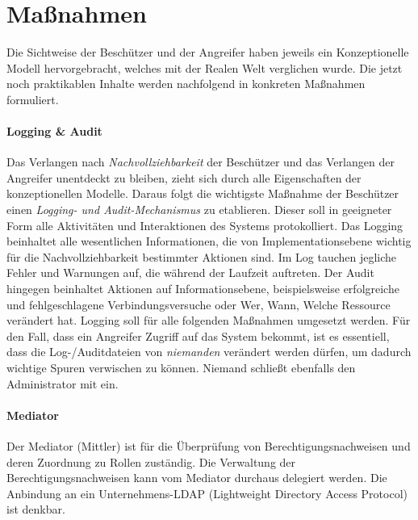 \documentclass[11pt,a4paper]{report}
\begin{document}
\section{Maßnahmen} \label{sec:analysis_measures}

Die Sichtweise der Beschützer und der Angreifer haben jeweils ein Konzeptionelle Modell hervorgebracht, welches mit der Realen Welt verglichen wurde. Die jetzt noch praktikablen Inhalte werden nachfolgend in konkreten Maßnahmen formuliert. 

\paragraph{Logging \& Audit}
Das Verlangen nach \textit{Nachvollziehbarkeit} der Beschützer und das Verlangen der Angreifer unentdeckt zu bleiben, zieht sich durch alle Eigenschaften der konzeptionellen Modelle. Daraus folgt die wichtigste Maßnahme der Beschützer einen \textit{Logging- und Audit-Mechanismus} zu etablieren. Dieser soll in geeigneter Form alle Aktivitäten und Interaktionen des Systems protokolliert. Das Logging beinhaltet alle wesentlichen Informationen, die von Implementationsebene wichtig für die Nachvollziehbarkeit bestimmter Aktionen sind. Im Log tauchen jegliche Fehler und Warnungen auf, die während der Laufzeit auftreten. Der Audit hingegen beinhaltet Aktionen auf Informationsebene, beispielsweise erfolgreiche und fehlgeschlagene Verbindungsversuche oder Wer, Wann, Welche Ressource verändert hat. Logging soll für alle folgenden Maßnahmen umgesetzt werden. Für den Fall, dass ein Angreifer Zugriff auf das System bekommt, ist es essentiell, dass die Log-/Auditdateien von \textit{niemanden} verändert werden dürfen, um dadurch wichtige Spuren verwischen zu können. Niemand schließt ebenfalls den Administrator mit ein.

\paragraph{Mediator} 
Der Mediator (Mittler) ist für die Überprüfung von Berechtigungsnachweisen und deren Zuordnung zu Rollen zuständig. Die Verwaltung der Berechtigungsnachweisen kann vom Mediator durchaus delegiert werden. Die Anbindung an ein Unternehmens-LDAP (Lightweight Directory Access Protocol) ist denkbar. 
\end{document}
